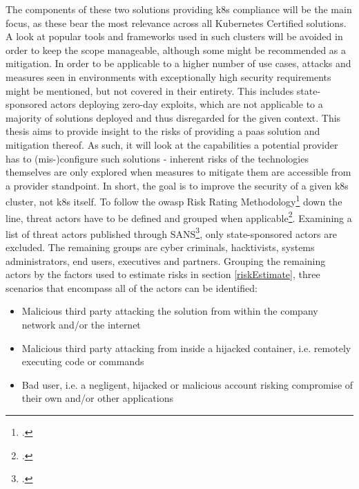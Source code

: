 The components of these two solutions providing \gls{k8s} compliance will be the main focus, as these bear the most relevance across all Kubernetes Certified solutions. 
A look at popular tools and frameworks used in such clusters will be avoided in order to keep the scope manageable, although some might be recommended as a mitigation.
In order to be applicable to a higher number of use cases, attacks and measures seen in environments with exceptionally high security requirements might be mentioned, but not  covered in their entirety. This includes state-sponsored actors deploying zero-day exploits, which are not applicable to a majority of solutions deployed and thus disregarded for the given context.
This thesis aims to provide insight to the risks of providing a \gls{paas} solution and mitigation thereof. 
As such, it will look at the capabilities a potential provider has to (mis-)configure such solutions - inherent risks of the technologies themselves are only explored when measures to mitigate them are accessible from a provider standpoint. 
In short, the goal is to improve the security of a given \gls{k8s} cluster, not \gls{k8s} itself.
To follow the \gls{owasp} Risk Rating Methodology\footcite{riskRating} down the line, threat actors have to be defined and grouped when applicable\footcite[][, Section 'Define all possible threats']{threatModeling}. Examining a list of threat actors published through SANS\footcite[][p. 12 to 17]{sansThreatActors}, only state-sponsored actors are excluded. The remaining groups are cyber criminals, hacktivists, systems administrators, end users, executives and partners.
Grouping the remaining actors by the factors used to estimate risks in section \ref{riskEstimate}, three scenarios that encompass all of the actors can be identified:
\begin{itemize}

\item Malicious third party attacking the solution from within the company network and/or the internet

\item Malicious third party attacking from inside a hijacked container, i.e. remotely executing code or commands

\item Bad user, i.e. a negligent, hijacked or malicious account risking compromise of their own and/or other applications

\end{itemize}

